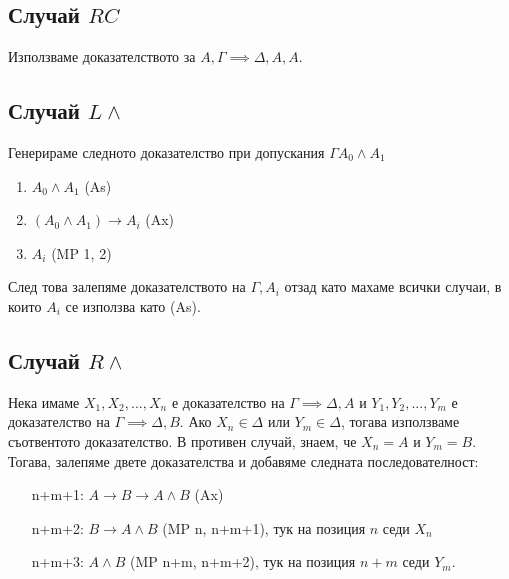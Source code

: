 \documentclass[12pt]{article}
\begin{document}
\subsection*{Случай $RC$}
Използваме доказателството за $A, \Gamma \implies \Delta, A, A$.

\subsection*{Случай $L \land$}
Генерираме следното доказателство при допускания $\Gamma A_0 \land A_1$
\begin{enumerate}
    \item $A_0 \land A_1$ (As)
    \item $(A_0 \land A_1) \rightarrow A_i$ (Ax)
    \item $A_i$ (MP 1, 2) 
\end{enumerate}

След това залепяме доказателството на $\Gamma, A_i$ отзад като махаме всички случаи, в които $A_i$ се използва като (As).

\subsection*{Случай $R \land$}
Нека имаме $X_1, X_2, ..., X_n$ е доказателство на $\Gamma \implies \Delta, A$ и $Y_1, Y_2, ..., Y_m$ е доказателство на $\Gamma \implies \Delta, B$. Ако $X_n \in \Delta$ или $Y_m \in \Delta$, тогава използваме съотвентото доказателство. В противен случай, знаем, че $X_n = A$ и $Y_m = B$. Тогава, залепяме двете доказателства и добавяме следната последователност:
\begin{itemize}[itemindent=4em]
    \item[n+m+1: ] $A \rightarrow B \rightarrow A \land B$ (Ax)    
    \item[n+m+2: ] $B \rightarrow A \land B$ (MP n, n+m+1), тук на позиция $n$ седи $X_n$ 
    \item[n+m+3: ] $A \land B$ (MP n+m, n+m+2), тук на позиция $n+m$ седи $Y_m$.
\end{itemize}
\end{document}
